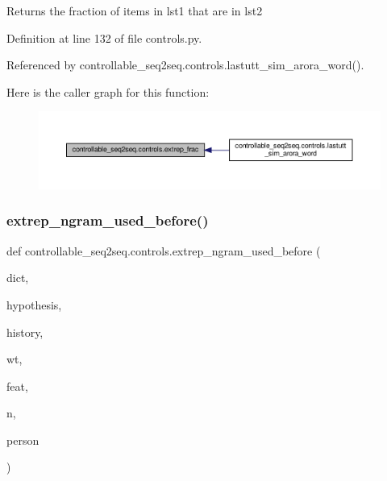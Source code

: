 \begin{DoxyVerb}Returns the fraction of items in lst1 that are in lst2\end{DoxyVerb}
 

Definition at line 132 of file controls.\+py.



Referenced by controllable\+\_\+seq2seq.\+controls.\+lastutt\+\_\+sim\+\_\+arora\+\_\+word().

Here is the caller graph for this function\+:
\nopagebreak
\begin{figure}[H]
\begin{center}
\leavevmode
\includegraphics[width=350pt]{namespacecontrollable__seq2seq_1_1controls_ab7554c2785504a4bd181168ad30ba9e0_icgraph}
\end{center}
\end{figure}
\mbox{\label{namespacecontrollable__seq2seq_1_1controls_acce6374d8291de7af1df375285d65054}} 
\subsubsection{\texorpdfstring{extrep\+\_\+ngram\+\_\+used\+\_\+before()}{extrep\_ngram\_used\_before()}}
{\footnotesize\ttfamily def controllable\+\_\+seq2seq.\+controls.\+extrep\+\_\+ngram\+\_\+used\+\_\+before (\begin{DoxyParamCaption}\item[{}]{dict,  }\item[{}]{hypothesis,  }\item[{}]{history,  }\item[{}]{wt,  }\item[{}]{feat,  }\item[{}]{n,  }\item[{}]{person }\end{DoxyParamCaption})}

